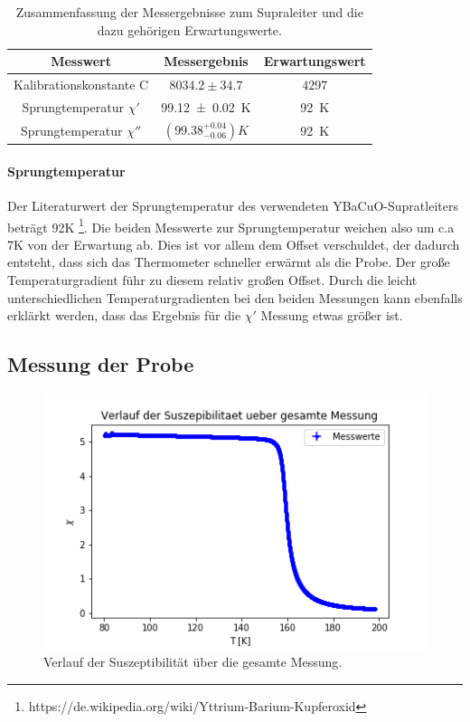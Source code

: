 \documentclass[12pt,a4paper]{article}
\begin{document}
\begin{table}
\centering
\begin{tabular}{|c|c|c|}
\hline 
Messwert & Messergebnis & Erwartungswert \\
\hline 
Kalibrationskonstante C & $8034.2\pm 34.7$ & $4297$ \\ 
\hline 
Sprungtemperatur $\chi'$ & \SI{99.12\pm 0.02}{K} & \SI{92}{K} \\ 
\hline 
Sprungtemperatur $\chi''$ & $(99.38^{+0.04}_{-0.06}) K$ & \SI{92}{K} \\ 
\hline 
\end{tabular} 
\caption{Zusammenfassung der Messergebnisse zum Supraleiter und die dazu gehörigen Erwartungswerte.}
\label{tab:supra_ergebnis}
\end{table}

\paragraph{Sprungtemperatur}
Der Literaturwert der Sprungtemperatur des verwendeten YBaCuO-Supratleiters beträgt 92K \footnote{https://de.wikipedia.org/wiki/Yttrium-Barium-Kupferoxid}. Die beiden Messwerte zur Sprungtemperatur weichen also um c.a 7K von der Erwartung ab. Dies ist vor allem dem Offset verschuldet, der dadurch entsteht, dass sich das Thermometer schneller erwärmt als die Probe. Der große Temperaturgradient führ zu diesem relativ großen Offset. Durch die leicht unterschiedlichen Temperaturgradienten bei den beiden Messungen kann ebenfalls erklärkt werden, dass das Ergebnis für die $\chi'$ Messung etwas größer ist.
\subsection{Messung der Probe}

\begin{figure}
\centering
\includegraphics[scale=1]{Bilder/Haupt_Probe/Suszeptibilitaet_Verlauf.png}
\caption[test]{Verlauf der Suszeptibilität über die gesamte Messung.}
\label{fig:Suszeptibilitaet_Verlauf}
\end{figure}
\end{document}
